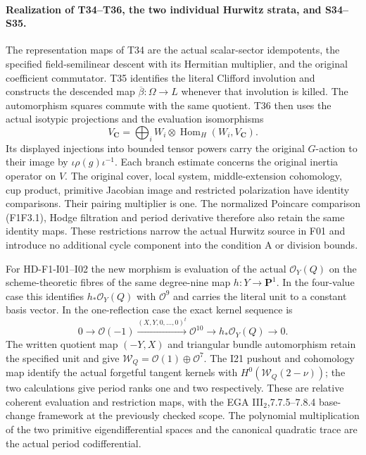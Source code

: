 \paragraph{Realization of T34--T36, the two individual Hurwitz strata, and S34--S35.}
The representation maps of T34 are the actual scalar-sector
idempotents, the specified field-semilinear descent with its
Hermitian multiplier, and the original coefficient commutator.
T35 identifies the literal Clifford involution and constructs
the descended map $\overline\beta:\Omega\to L$ whenever
that involution is killed. The automorphism squares commute
with the same quotient. T36 then uses the actual isotypic
projections and the evaluation isomorphisms
\[
 V_{\mathbf C}=\bigoplus_i W_i\otimes
                 \operatorname{Hom}_H(W_i,V_{\mathbf C}).
\]
Its displayed injections into bounded tensor powers carry
the original $G$-action to their image by
$\iota\rho(g)\iota^{-1}$. Each branch estimate concerns
the original inertia operator on $V$. The original cover,
local system, middle-extension cohomology, cup product,
primitive Jacobian image and restricted polarization have
identity comparisons. Their pairing multiplier is one.
The normalized Poincare comparison (F1F3.1), Hodge
filtration and period derivative therefore also retain
the same identity maps. These restrictions narrow the
actual Hurwitz source in F01 and introduce no additional
cycle component into the condition A or division bounds.

For HD-F1-I01--I02 the new morphism is evaluation of
the actual $\mathcal O_Y(Q)$ on the scheme-theoretic
fibres of the same degree-nine map $h:Y\to\mathbf P^1$.
In the four-value case this identifies
$h_*\mathcal O_Y(Q)$ with $\mathcal O^9$ and carries
the literal unit to a constant basis vector. In the
one-reflection case the exact kernel sequence is
\[
 0\longrightarrow\mathcal O(-1)
   \xrightarrow{(X,Y,0,\ldots,0)^t}\mathcal O^{10}
   \longrightarrow h_*\mathcal O_Y(Q)\longrightarrow0.
\]
The written quotient map $(-Y,X)$ and triangular
bundle automorphism retain the specified unit and give
$\mathcal W_Q=\mathcal O(1)\oplus\mathcal O^7$.
The I21 pushout and cohomology map identify the actual
forgetful tangent kernels with
$H^0(\mathcal W_Q(2-\nu))$; the two calculations give
period ranks one and two respectively. These are
relative coherent evaluation and restriction maps,
with the EGA III$_2$,7.7.5--7.8.4 base-change framework
at the previously checked scope. The polynomial
multiplication of the two primitive eigendifferential
spaces and the canonical quadratic trace are the
actual period codifferential.

